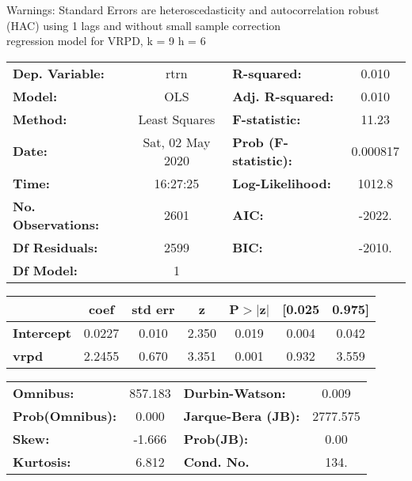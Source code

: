 Warnings: \newline
 [1] Standard Errors are heteroscedasticity and autocorrelation robust (HAC) using 1 lags and without small sample correction\\ 

regression model for VRPD, k = 9 h = 6\begin{center}
\begin{tabular}{lclc}
\toprule
\textbf{Dep. Variable:}    &       rtrn       & \textbf{  R-squared:         } &     0.010   \\
\textbf{Model:}            &       OLS        & \textbf{  Adj. R-squared:    } &     0.010   \\
\textbf{Method:}           &  Least Squares   & \textbf{  F-statistic:       } &     11.23   \\
\textbf{Date:}             & Sat, 02 May 2020 & \textbf{  Prob (F-statistic):} &  0.000817   \\
\textbf{Time:}             &     16:27:25     & \textbf{  Log-Likelihood:    } &    1012.8   \\
\textbf{No. Observations:} &        2601      & \textbf{  AIC:               } &    -2022.   \\
\textbf{Df Residuals:}     &        2599      & \textbf{  BIC:               } &    -2010.   \\
\textbf{Df Model:}         &           1      & \textbf{                     } &             \\
\bottomrule
\end{tabular}
\begin{tabular}{lcccccc}
                   & \textbf{coef} & \textbf{std err} & \textbf{z} & \textbf{P$> |$z$|$} & \textbf{[0.025} & \textbf{0.975]}  \\
\midrule
\textbf{Intercept} &       0.0227  &        0.010     &     2.350  &         0.019        &        0.004    &        0.042     \\
\textbf{vrpd}      &       2.2455  &        0.670     &     3.351  &         0.001        &        0.932    &        3.559     \\
\bottomrule
\end{tabular}
\begin{tabular}{lclc}
\textbf{Omnibus:}       & 857.183 & \textbf{  Durbin-Watson:     } &    0.009  \\
\textbf{Prob(Omnibus):} &   0.000 & \textbf{  Jarque-Bera (JB):  } & 2777.575  \\
\textbf{Skew:}          &  -1.666 & \textbf{  Prob(JB):          } &     0.00  \\
\textbf{Kurtosis:}      &   6.812 & \textbf{  Cond. No.          } &     134.  \\
\bottomrule
\end{tabular}
\end{center}

